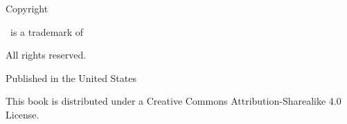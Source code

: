 \pagestyle{empty}

  \begin{center}

  \sffamily

  \makeatletter  \small \thetitle \par \makeatother
  \makeatletter  \small \textit{\thesubtitle} \par \makeatother

    Copyright \ccLogo\ \makeatletter \thedate\ \theauthor \makeatother \par
    \trademark\ is a trademark of \thepublisher \par
    All rights reserved. \par

    \vspace{0.4cm}

    Published in the United States

    \vspace{0.4cm}

    This book is distributed under a Creative Commons Attribution-Sharealike 4.0 License. \par

    \vspace{0.4cm}

    \ccbysa

  \end{center}

